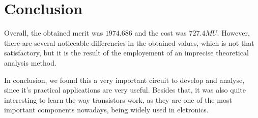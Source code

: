 \section{Conclusion}
\label{sec:conclusion}
\vspace{3mm}

\par Overall, the obtained merit was $1974.686$ and the cost was $727.4 MU$. However, there are several noticeable differencies in the obtained values, which is not that satisfactory, but it is the result of the employement of an imprecise theoretical analysis method. 
\par In conclusion, we found this a very important circuit to develop and analyse, since it's practical applications are very useful. Besides that, it was also quite interesting to learn the way transistors work, as they are one of the most important components nowadays, being widely used in eletronics. 